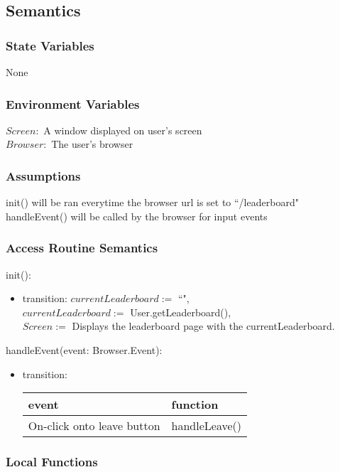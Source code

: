 \documentclass[12pt, titlepage]{article}
\begin{document}
\subsection{Semantics}

\subsubsection{State Variables}
None
\subsubsection{Environment Variables}

$Screen: $ A window displayed on user's screen\\
$Browser: $ The user's browser

\subsubsection{Assumptions}

init() will be ran everytime the browser url is set to ``/leaderboard"\\
handleEvent() will be called by the browser for input events

\subsubsection{Access Routine Semantics}

\noindent init():
\begin{itemize}
\item transition: $currentLeaderboard :=$ ``",\\
$currentLeaderboard :=$ User.getLeaderboard(),\\
$Screen :=$ Displays the leaderboard page with the currentLeaderboard. 
\end{itemize}

\noindent handleEvent(event: Browser.Event):
\begin{itemize}
\item transition: \begin{tabular}{p{5cm} p{4cm}}
\hline
\textbf{event} & \textbf{function} \\
\hline
On-click onto leave button & handleLeave() \\
\hline
\end{tabular}
    
\end{itemize}

\subsubsection{Local Functions}
\end{document}
